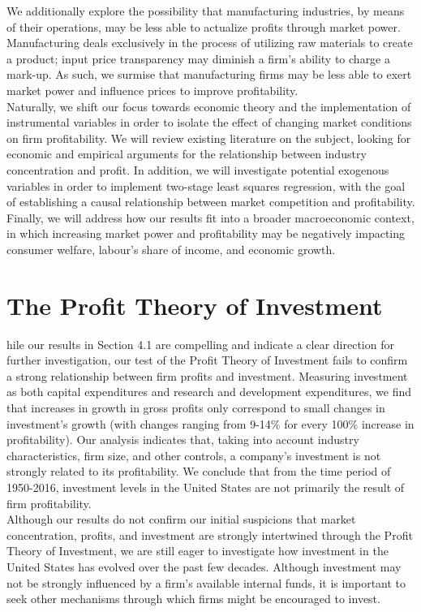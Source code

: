 We additionally explore the possibility that manufacturing industries, by means of their operations, may be less able to actualize profits through market power. Manufacturing deals exclusively in the process of utilizing raw materials to create a product; input price transparency may diminish a firm’s ability to charge a mark-up. As such, we surmise that manufacturing firms may be less able to exert market power and influence prices to improve profitability. \\

	Naturally, we shift our focus towards economic theory and the implementation of instrumental variables in order to isolate the effect of changing market conditions on firm profitability. We will review existing literature on the subject, looking for economic and empirical arguments for the relationship between industry concentration and profit. In addition, we will investigate potential exogenous variables in order to implement two-stage least squares regression, with the goal of establishing a causal relationship between market competition and profitability. Finally, we will address how our results fit into a broader macroeconomic context, in which increasing market power and profitability may be negatively impacting consumer welfare, labour’s share of income, and economic growth. \\

\section{The Profit Theory of Investment}

hile our results in Section 4.1 are compelling and indicate a clear direction for further investigation, our test of the Profit Theory of Investment fails to confirm a strong relationship between firm profits and investment. Measuring investment as both capital expenditures and research and development expenditures, we find that increases in growth in gross profits only correspond to small changes in investment's growth (with changes ranging from 9-14\% for every 100\% increase in profitability). Our analysis indicates that, taking into account industry characteristics, firm size, and other controls, a company’s investment is not strongly related to its profitability. We conclude that from the time period of 1950-2016, investment levels in the United States are not primarily the result of firm profitability. \\

Although our results do not confirm our initial suspicions that market concentration, profits, and investment are strongly  intertwined through the Profit Theory of Investment, we are still eager to investigate how investment in the United States has evolved over the past few decades. Although investment may not be strongly influenced by a firm’s available internal funds, it is important to seek other mechanisms through which firms might be encouraged to invest. \\

